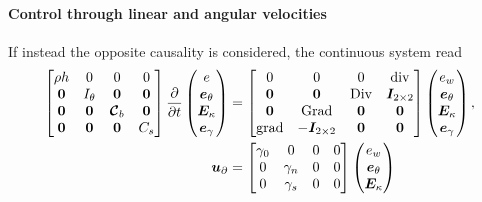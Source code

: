 \paragraph{Control through linear and angular velocities} If instead the opposite causality is considered, the continuous system read
\begin{subequations}\label{eq:phlinsys_Min2}
	\begin{align}
	\begin{bmatrix}
	\rho h  & 0  & 0  & 0 \\
	\bm{0} & I_\theta &  \bm{0} & \bm{0}\\
	\bm{0}  & \bm{0}  & \bm{\mathcal{C}}_b  & \bm{0}\\
	\bm{0} & \bm{0} &  \bm{0} & C_s \\
	\end{bmatrix}
	\diffp{}{t}
	\begin{pmatrix}
	e \\
	\bm{e}_\theta \\
	\bm{E}_\kappa \\
	\bm{e}_{\gamma} \\
	\end{pmatrix} &= 
	\begin{bmatrix}
	0  & 0  & 0  & \div \\
	\bm{0} & \bm{0} &  \Div & \bm{I}_{2 \times 2}\\
	\bm{0}  & \Grad  & \bm{0}  & \bm{0}\\
	\grad & -\bm{I}_{2 \times 2} &  \bm{0} & \bm{0} \\
	\end{bmatrix}
	\begin{pmatrix}
	e_w \\
	\bm{e}_{\theta} \\
	\bm{E}_{\kappa} \\
	\bm{e}_{\gamma} \\
	\end{pmatrix},  \label{eq:pHdyn_Min2}  \\
	\bm{u}_\partial &= 
	\begin{bmatrix}
	\gamma_{0} & {0} & {0} & {0} \\
	{0} & \gamma_{n} & {0} & {0} \\
	{0} & \gamma_{s} & {0} & {0} \\
	\end{bmatrix}
	\begin{pmatrix}
	e_w \\
	\bm{e}_{\theta} \\
	\bm{E}_{\kappa} \\

\end{pmatrix}
\end{align}
\end{subequations}
